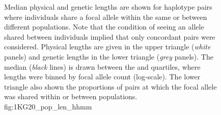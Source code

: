 

\begin{figure}[p]
\centering
{}
%
{Median physical and genetic lengths are shown for haplotype pairs where individuals share a focal allele within the same or between different populations.
Note that the condition of seeing an allele shared between individuals implied that only concordant pairs were considered.
Physical lengths are given in the upper triangle (\emph{white} panels) and genetic lengths in the lower triangle (\emph{grey} panels).
The median (\emph{black} lines) is drawn between the  and  quartiles, where lengths were binned by focal allele count (log-scale).
The lower triangle also shown the proportions of pairs at which the focal allele was shared within or between populations.}%
{fig:1KG20_pop_len_hhmm}
\end{figure}
